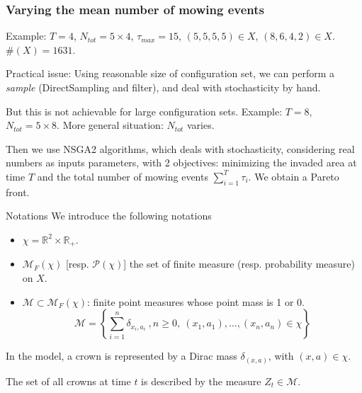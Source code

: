 \documentclass{myBeamer}
\newcommand{\R}{\mathbb R}%
\newcommand{\Mcal}{\mathcal{M}}%
\newcommand{\Pcal}{\mathcal P}%
\begin{document}
\begin{frame}%
\frametitle{Varying the mean number of mowing events}

\smallbreak
Example: $T=4$, $N_{tot} = 5 \times 4$, $\tau_{max} = 15 $,  $(5,5,5,5) \in X$, $(8,6,4,2) \in X$.  $ \#(X) = 1631$.

\bigbreak 
Practical issue: Using reasonable size of configuration set, we can perform a \textit{sample} (DirectSampling and filter), and deal with stochasticity by hand.

\pause
\smallbreak  %
But this is not achievable for large configuration sets.
\smallbreak
Example: $T=8$, $N_{tot} = 5 \times 8$. %
\smallbreak
\pause
More general situation: $N_{tot}$ varies. %

Then we use NSGA2 algorithms, which deals with stochasticity, considering real numbers as inputs parameters, with 2 objectives: minimizing the invaded area at time $T$ and the total number of mowing events $\sum_{i=1}^{T} \tau_i$. We obtain a Pareto front.  
  
\end{frame}




\begin{frame}{Notations}
We introduce the following notations 
\begin{itemize}
 \item $ \chi = \R^2 \times \R_+$. 
 \item $\Mcal_F ( \chi )$  [resp. $\Pcal(\chi)$] the set of finite measure (resp. probability measure) on $X$. 
\item   $\Mcal \subset \Mcal_F ( \chi)$: finite point measures whose point mass is 1 or 0.  
\begin{equation*}
\Mcal = \left\{  \sum_{i=1}^n  \delta_{x_i,a_i} ~ , n \geq 0 , ~ (x_1,a_1), \ldots, (x_n,a_n) \in      \chi  \right\}
\end{equation*}   
\end{itemize}

In the model, a crown is represented by a Dirac mass $\delta_{(x,a)}$, with $(x,a) \in \chi$.

\smallbreak
The set of all crowns at time $t$ is described by the measure $Z_t \in \Mcal$.
\end{frame}
\end{document}
